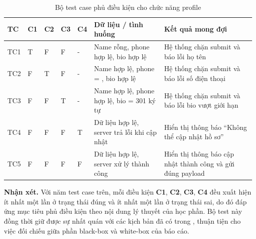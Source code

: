 \begin{table}[H]
	\centering
	\small
	\renewcommand{\arraystretch}{1.25}
	\begin{tabularx}{\textwidth}{|>{\centering\arraybackslash}p{1.3cm}|>{\centering\arraybackslash}p{1.0cm}|>{\centering\arraybackslash}p{1.0cm}|>{\centering\arraybackslash}p{1.0cm}|>{\centering\arraybackslash}p{1.0cm}|>{\raggedright\arraybackslash}X|>{\raggedright\arraybackslash}p{3.8cm}|}
		\hline
		\textbf{TC} & \textbf{C1} & \textbf{C2} & \textbf{C3} & \textbf{C4} & \textbf{Dữ liệu / tình huống}                            & \textbf{Kết quả mong đợi}                                  \\
		\hline
		TC1         & T           & F           & F           & -           & Name rỗng, phone hợp lệ, bio hợp lệ                      & Hệ thống chặn submit và báo lỗi họ tên                     \\
		\hline
		TC2         & F           & T           & F           & -           & Name hợp lệ, phone = \code{12345}, bio hợp lệ          & Hệ thống chặn submit và báo lỗi số điện thoại              \\
		\hline
		TC3         & F           & F           & T           & -           & Name hợp lệ, phone hợp lệ, bio = 301 ký tự               & Hệ thống chặn submit và báo lỗi bio vượt giới hạn          \\
		\hline
		TC4         & F           & F           & F           & T           & Dữ liệu hợp lệ, server trả lỗi \code{500} khi cập nhật & Hiển thị thông báo ``Không thể cập nhật hồ sơ''            \\
		\hline
		TC5         & F           & F           & F           & F           & Dữ liệu hợp lệ, server xử lý thành công                  & Hiển thị thông báo cập nhật thành công và gửi đúng payload \\
		\hline
	\end{tabularx}
	\caption{Bộ test case phủ điều kiện cho chức năng profile}
	\label{tab:profile-condition-coverage}
\end{table}

\textbf{Nhận xét.} Với năm test case trên, mỗi điều kiện \textbf{C1}, \textbf{C2}, \textbf{C3}, \textbf{C4} đều xuất hiện ít nhất một lần ở trạng thái đúng và ít nhất một lần ở trạng thái sai, do đó đáp ứng mục tiêu phủ điều kiện theo nội dung lý thuyết của học phần. Bộ test này đồng thời giữ được sự nhất quán với các kịch bản đã có trong , thuận tiện cho việc đối chiếu giữa phần black-box và white-box của báo cáo.

